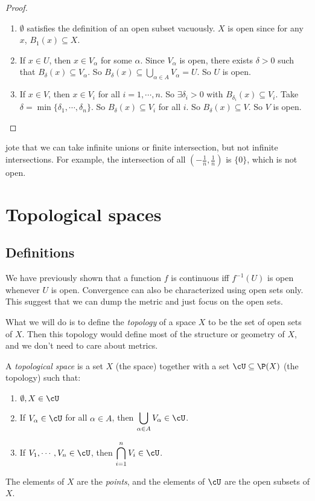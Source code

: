 \documentclass[a4paper]{article}
\begin{document}
\begin{proof}\leavevmode
  \begin{enumerate}
    \item $\emptyset$ satisfies the definition of an open subset vacuously. $X$ is open since for any $x$, $B_1(x) \subseteq X$.
    \item If $x\in U$, then $x\in V_\alpha$ for some $\alpha$. Since $V_\alpha$ is open, there exists $\delta > 0$ such that $B_\delta(x) \subseteq V_\alpha$. So $\displaystyle B_\delta (x) \subseteq \bigcup_{\alpha \in A}V_\alpha = U$. So $U$ is open.
    \item If $x\in V$, then $x\in V_i$ for all $i = 1, \cdots, n$. So $\exists \delta_i > 0$ with $B_{\delta_i}(x) \subseteq V_i$. Take $\delta = \min\{\delta_1, \cdots, \delta_n\}$. So $B_\delta(x) \subseteq V_i$ for all $i$. So $B_\delta(x) \subseteq V$. So $V$ is open.
  \end{enumerate}
\end{proof}
jote that we can take infinite unions or finite intersection, but not infinite intersections. For example, the intersection of all $(-\frac{1}{n}, \frac{1}{n})$ is $\{0\}$, which is not open.

\section{Topological spaces}
\subsection{Definitions}
We have previously shown that a function $f$ is continuous iff $f^{-1}(U)$ is open whenever $U$ is open. Convergence can also be characterized using open sets only. This suggest that we can dump the metric and just focus on the open sets.

What we will do is to define the \emph{topology} of a space $X$ to be the set of open sets of $X$. Then this topology would define most of the structure or geometry of $X$, and we don't need to care about metrics.

\begin{defi}
  A \emph{topological space} is a set $X$ (the space) together with a set $\cU \subseteq \P(X)$ (the topology) such that:
  \begin{enumerate}
    \item $\emptyset, X\in \cU$
    \item If $V_\alpha\in \cU$ for all $\alpha \in A$, then $\displaystyle \bigcup_{\alpha\in A}V_\alpha \in \cU$.
    \item If $V_1, \cdots, V_n \in \cU$, then $\displaystyle \bigcap_{i = 1}^n V_i \in \cU$.
  \end{enumerate}
  The elements of $X$ are the \emph{points}, and the elements of $\cU$ are the open subsets of $X$.
\end{defi}
\end{document}
